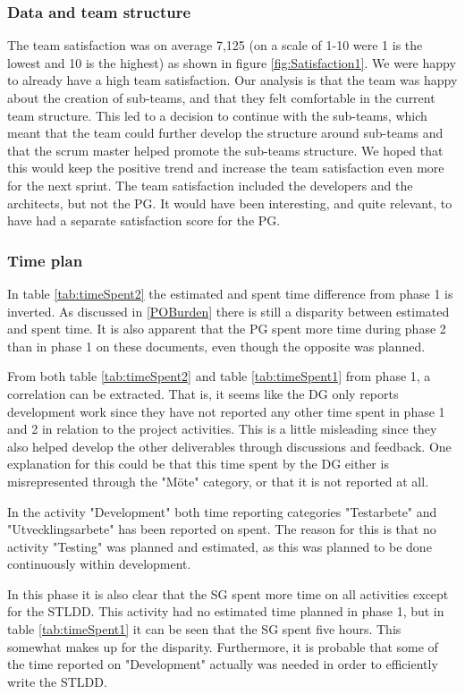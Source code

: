 \documentclass{article}
\begin{document}
\subsubsection{Data and team structure}
The team satisfaction was on average 7,125 (on a scale of 1-10 were 1 is the lowest and 10 is the highest) as shown in figure \ref{fig:Satisfaction1}. We were happy to already have a high team satisfaction. Our analysis is that the team was happy about the creation of sub-teams, and that they felt comfortable in the current team structure. This led to a decision to continue with the sub-teams, which meant that the team could further develop the structure around sub-teams and that the scrum master helped promote the sub-teams structure. We hoped that this would keep the positive trend and increase the team satisfaction even more for the next sprint. The team satisfaction included the developers and the architects, but not the PG. It would have been interesting, and quite relevant, to have had a separate satisfaction score for the PG.

\subsubsection{Time plan}
In table \ref{tab:timeSpent2} the estimated and spent time difference from phase 1 is inverted. As discussed in \ref{POBurden} there is still a disparity between estimated and spent time. It is also apparent that the PG spent more time during phase 2 than in phase 1 on these documents, even though the opposite was planned.  

From both table \ref{tab:timeSpent2} and table \ref{tab:timeSpent1} from phase 1, a correlation can be extracted. That is, it seems like the DG only reports development work since they have not reported any other time spent in phase 1 and 2 in relation to the project activities. This is a little misleading since they also helped develop the other deliverables through discussions and feedback. One explanation for this could be that this time spent by the DG either is misrepresented through the "Möte" category, or that it is not reported at all. 

In the activity "Development" both time reporting categories "Testarbete" and "Utvecklingsarbete" has been reported on spent. The reason for this is that no activity "Testing" was planned and estimated, as this was planned to be done continuously within development. 

In this phase it is also clear that the SG spent more time on all activities except for the STLDD. This activity had no estimated time planned in phase 1, but in table \ref{tab:timeSpent1} it can be seen that the SG spent five hours. This somewhat makes up for the disparity. Furthermore, it is probable that some of the time reported on "Development" actually was needed in order to efficiently write the STLDD.
\end{document}

